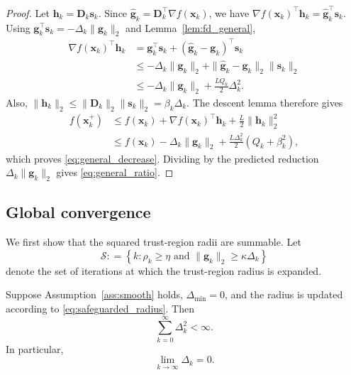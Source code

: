 \documentclass{siamart171218}
\newcommand{\bx}{\bm{x}}
\newcommand{\bg}{\bm{g}}
\newcommand{\bs}{\bm{s}}
\providecommand{\coloneqq}{\mathrel{\mathop:}=}
\begin{document}
\begin{proof}
Let $\bm h_k = \bm D_k\bs_k$. Since $\hat{\bg}_k = \bm D_k^\top\nabla f(\bx_k)$, we have $\nabla f(\bx_k)^\top\bm h_k = \hat{\bg}_k^\top\bs_k$. Using $\bg_k^\top\bs_k = -\Delta_k\|\bg_k\|_2$ and Lemma~\ref{lem:fd_general},
\[
\begin{aligned}
\nabla f(\bx_k)^\top\bm h_k &= \bg_k^\top\bs_k + (\hat{\bg}_k-\bg_k)^\top\bs_k \\
&\le -\Delta_k\|\bg_k\|_2 + \|\hat{\bg}_k-\bg_k\|_2\|\bs_k\|_2 \\
&\le -\Delta_k\|\bg_k\|_2 + \frac{LQ_k}{2}\Delta_k^2.
\end{aligned}
\]
Also, $\|\bm h_k\|_2 \le \|\bm D_k\|_2\|\bs_k\|_2 = \beta_k\Delta_k$. The descent lemma therefore gives
\[
\begin{aligned}
f(\bx_k^+) &\le f(\bx_k) + \nabla f(\bx_k)^\top\bm h_k + \frac{L}{2}\|\bm h_k\|_2^2 \\
&\le f(\bx_k) - \Delta_k\|\bg_k\|_2 + \frac{L\Delta_k^2}{2} (Q_k+\beta_k^2),
\end{aligned}
\]
which proves \eqref{eq:general_decrease}. Dividing by the predicted reduction $\Delta_k\|\bg_k\|_2$ gives \eqref{eq:general_ratio}.
\end{proof}

\subsection{Global convergence}
\label{subsec:global_convergence}

We first show that the squared trust-region radii are summable. Let
\begin{equation}
\label{eq:expansion_set}
\mathcal S \coloneqq \left\{ k : \rho_k\ge\eta \text{ and } \|\bg_k\|_2\ge\kappa\Delta_k \right\}
\end{equation}
denote the set of iterations at which the trust-region radius is expanded.

\begin{lemma}
\label{lem:radius_summability}
\label{lem:radius_decay}
Suppose Assumption~\ref{ass:smooth} holds, $\Delta_{\min}=0$, and the radius is updated according to \eqref{eq:safeguarded_radius}. Then
\begin{equation}
\label{eq:radius_square_summable}
\sum_{k=0}^{\infty}\Delta_k^2 < \infty.
\end{equation}
In particular,
\begin{equation}
\label{eq:radius_to_zero}
\lim_{k\to\infty} \Delta_k = 0.
\end{equation}
\end{lemma}
\end{document}

